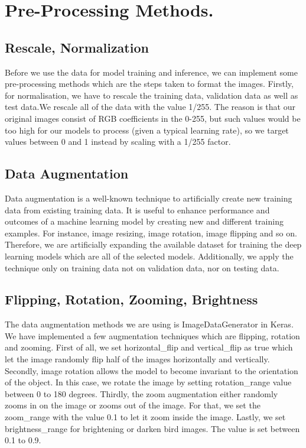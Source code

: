 \pagebreak
\section{Pre-Processing Methods.}

\subsection{Rescale, Normalization}
Before we use the data for model training and inference, we can implement some pre-processing methods which are the steps taken to format the images. Firstly, for normalisation, we have to rescale the training data, validation data as well as test data.We rescale all of the data with the value 1/255. The reason is that our original images consist of RGB coefficients in the 0-255, but such values would be too high for our models to process (given a typical learning rate), so we target values between 0 and 1 instead by scaling with a 1/255 factor.

\subsection{Data Augmentation}
Data augmentation is a well-known technique to artificially create new training data from existing training data. It is useful to enhance performance and outcomes of a machine learning model by creating new and different training examples. For instance, image resizing, image rotation, image flipping and so on. Therefore, we are artificially expanding the available dataset for training the deep learning models which are all of the selected models. Additionally, we apply the technique only on training data not on validation data, nor on testing data. 

\subsection{Flipping, Rotation, Zooming, Brightness}
The data augmentation methods we are using is ImageDataGenerator in Keras. We have implemented a few augmentation techniques which are flipping, rotation and zooming. First of all, we set horizontal\_flip and vertical\_flip as true which let the image randomly flip half of the images horizontally and vertically. Secondly, image rotation allows the model to become invariant to the orientation of the object. In this case, we rotate the image by setting rotation\_range value between 0 to 180 degrees. Thirdly, the zoom augmentation either randomly zooms in on the image or zooms out of the image. For that, we set the zoom\_range with the value 0.1 to let it zoom inside the image. Lastly, we set brightness\_range for brightening or darken bird images. The value is set between 0.1 to 0.9.

